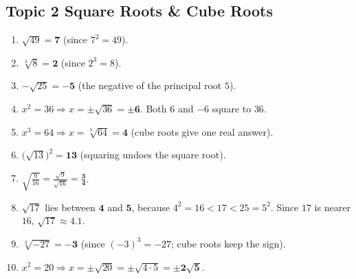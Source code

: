 \documentclass[11pt]{article}
\begin{document}
\subsection*{Topic 2 \; \textbullet\; Square Roots \& Cube Roots}
\begin{enumerate}[label=\textbf{\color{fangblue}\arabic*.},leftmargin=*,itemsep=5pt]
\item $\sqrt{49}=\mathbf{7}$ \; (since $7^{2}=49$).
\item $\sqrt[3]{8}=\mathbf{2}$ \; (since $2^{3}=8$).
\item $-\sqrt{25}=\mathbf{-5}$ \; (the negative of the principal root $5$).
\item $x^{2}=36\Rightarrow x=\pm\sqrt{36}=\mathbf{\pm 6}$. Both $6$ and $-6$ square to $36$.
\item $x^{3}=64\Rightarrow x=\sqrt[3]{64}=\mathbf{4}$ \; (cube roots give one real answer).
\item $\bigl(\sqrt{13}\bigr)^{2}=\mathbf{13}$ \; (squaring undoes the square root).
\item $\sqrt{\frac{9}{16}}=\frac{\sqrt{9}}{\sqrt{16}}=\mathbf{\frac{3}{4}}$.
\item $\sqrt{17}$ lies between $\mathbf{4}$ and $\mathbf{5}$, because
      $4^{2}=16<17<25=5^{2}$. Since $17$ is nearer $16$, $\sqrt{17}\approx 4.1$.
\item $\sqrt[3]{-27}=\mathbf{-3}$ \; (since $(-3)^{3}=-27$; cube roots keep the sign).
\item $x^{2}=20\Rightarrow x=\pm\sqrt{20}=\pm\sqrt{4\cdot 5}=\mathbf{\pm 2\sqrt{5}}$.
\end{enumerate}

\end{document}
